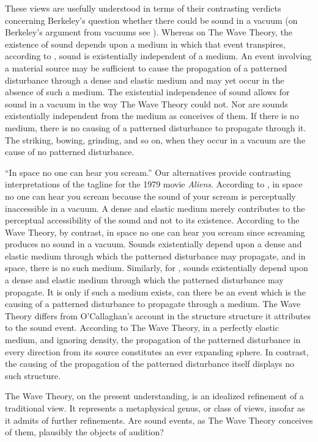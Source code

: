 These views are usefully understood in terms of their contrasting verdicts concerning Berkeley's question whether there could be sound in a vacuum (on Berkeley's argument from vacuums see \citealt{Pasnau:1999ss}). Whereas on The Wave Theory, the existence of sound depends upon a medium in which that event transpires, according to \citet{Casati:1994aa,Casati:2014hw}, sound is existentially independent of a medium. An event involving a material source may be sufficient to cause the propagation of a patterned disturbance through a dense and elastic medium and may yet occur in the absence of such a medium. The existential independence of sound allows for sound in a vacuum in the way The Wave Theory could not. Nor are sounds existentially independent from the medium as \citet{OCallaghan:2007xy,OCallaghan:2009aa} conceives of them. If there is no medium, there is no causing of a patterned disturbance to propagate through it. The striking, bowing, grinding, and so on, when they occur in a vacuum are the cause of no patterned disturbance.

``In space no one can hear you scream.'' Our alternatives provide contrasting interpretations of the tagline for the 1979 movie \emph{Aliens}. According to \citet{Casati:1994aa,Casati:2014hw}, in space no one can hear you scream because the sound of your scream is perceptually inaccessible in a vacuum. A dense and elastic medium merely contributes to the perceptual accessibility of the sound and not to its existence. According to the Wave Theory, by contrast, in space no one can hear you scream since screaming produces no sound in a vacuum. Sounds existentially depend upon a dense and elastic medium through which the patterned disturbance may propagate, and in space, there is no such medium. Similarly, for \citet{OCallaghan:2007xy,OCallaghan:2009aa}, sounds existentially depend upon a dense and elastic medium through which the patterned disturbance may propagate. It is only if such a medium exists, can there be an event which is the causing of a patterned disturbance to propagate through a medium. The Wave Theory differs from O'Callaghan's account in the structure structure it attributes to the sound event. According to The Wave Theory, in a perfectly elastic medium, and ignoring density, the propagation of the patterned disturbance in every direction from its source constitutes an ever expanding sphere. In contrast, the causing of the propagation of the patterned disturbance itself displays no such structure.

The Wave Theory, on the present understanding, is an idealized refinement of a traditional view. It represents a metaphysical genus, or class of views, insofar as it admits of further refinements. Are sound events, as The Wave Theory conceives of them, plausibly the objects of audition?

